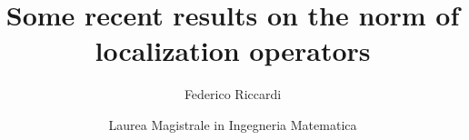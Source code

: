 \documentclass[aspectratio=141]{beamer}
\title[]{Some recent results on the norm of localization operators}
\date[ISPN ’80]{Laurea Magistrale in Ingegneria Matematica}
\author[F. Riccardi]{Federico Riccardi}
\begin{document}
\begin{frame}
\titlepage
\end{frame}

\end{document}

